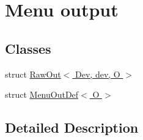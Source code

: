 \hypertarget{group__Output}{}\section{Menu output}
\label{group__Output}
\subsection*{Classes}
\begin{DoxyCompactItemize}
\item 
struct \hyperlink{structRawOut}{Raw\+Out$<$ Dev, dev, O $>$}
\item 
struct \hyperlink{structMenuOutDef}{Menu\+Out\+Def$<$ O $>$}
\end{DoxyCompactItemize}


\subsection{Detailed Description}

